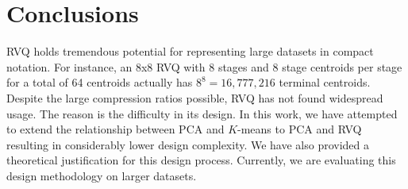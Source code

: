 \documentclass{article}
\begin{document}
\section{Conclusions}
RVQ holds tremendous potential for representing large datasets in compact notation.  For instance, an 8x8 RVQ with 8 stages and 8 stage centroids per stage for a total of 64 centroids actually has  $8^8=16,777,216$ terminal centroids.  Despite the large compression ratios possible, RVQ has not found widespread usage.  The reason is the difficulty in its design.  In this work, we have attempted to extend the relationship between PCA and $K$-means to PCA and RVQ resulting in considerably lower design complexity.  We have also provided a theoretical justification for this design process.  Currently, we are evaluating this design methodology on larger datasets. 








 



\end{document}
